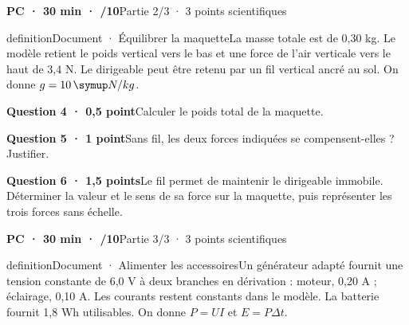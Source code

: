 \vfill{}
\textbf{PC · 30 min · /10}\hfill Partie 2/3 · 3 points scientifiques
\begin{pcEncadre}{definition}{Document · Équilibrer la maquette}La masse totale est de 0,30 kg. Le modèle retient le poids vertical vers le bas et une force de l’air verticale vers le haut de 3,4 N. Le dirigeable peut être retenu par un fil vertical ancré au sol. On donne $g=10\unite{N/kg}$.\end{pcEncadre}
\par\addvspace{3mm}\noindent\begin{minipage}{\linewidth}\textbf{Question 4 · 0,5 point}\quad Calculer le poids total de la maquette.\par\end{minipage}\par
\par\addvspace{3mm}\noindent\begin{minipage}{\linewidth}\textbf{Question 5 · 1 point}\quad Sans fil, les deux forces indiquées se compensent-elles ? Justifier.\par\end{minipage}\par
\par\addvspace{3mm}\noindent\begin{minipage}{\linewidth}\textbf{Question 6 · 1,5 points}\quad Le fil permet de maintenir le dirigeable immobile. Déterminer la valeur et le sens de sa force sur la maquette, puis représenter les trois forces sans échelle.\par\end{minipage}\par
\vfill{}
\textbf{PC · 30 min · /10}\hfill Partie 3/3 · 3 points scientifiques
\begin{pcEncadre}{definition}{Document · Alimenter les accessoires}Un générateur adapté fournit une tension constante de 6,0 V à deux branches en dérivation : moteur, 0,20 A ; éclairage, 0,10 A. Les courants restent constants dans le modèle. La batterie fournit 1,8 Wh utilisables. On donne $P=UI$ et $E=P\Delta t$.\end{pcEncadre}
